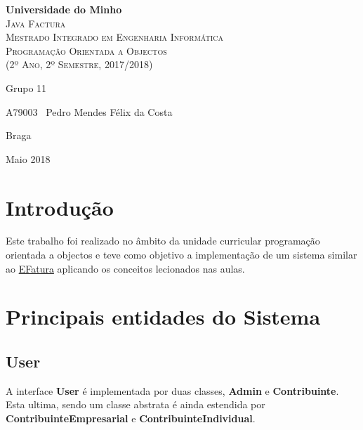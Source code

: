 \documentclass[10pt,a4paper]{article}
\begin{document}
\begin{titlepage}
    \center
    {\huge {\bf Universidade do Minho}}\\[0.4cm]
    \vspace{3.0cm}
    \textsc{\huge{Java Factura}}\\[0.5cm]
    \vspace{3.0cm}
    \textsc{\huge{Mestrado Integrado em Engenharia Informática}}\\[0.5cm]
    \vspace{2.0cm}
    \textsc{Programação Orientada a Objectos}\\[0.5cm]
    \textsc{(2º Ano, 2º Semestre, 2017/2018)}\\[0.5cm]
    \vspace{1.5cm}
    \begin{flushleft}
        Grupo 11
        \vspace{1cm}

        A79003 \,\,\,Pedro Mendes Félix da Costa
    \end{flushleft}
        \vspace{1cm}
    \begin{flushright}
        Braga

        Maio 2018
    \end{flushright}

\end{titlepage}

\tableofcontents
\clearpage

\section{Introdução}
    Este trabalho foi realizado no âmbito da unidade curricular programação
    orientada a objectos e teve como objetivo a implementação de um sistema
    similar ao \href{www.efactura.pt}{EFatura} aplicando os conceitos
    lecionados nas aulas.

\section{Principais entidades do Sistema}
    \subsection{User}
    A interface \textbf{User} é implementada por duas classes, \textbf{Admin} e
    \textbf{Contribuinte}. Esta ultima, sendo um classe abstrata é ainda
    estendida por \textbf{ContribuinteEmpresarial} e
    \textbf{ContribuinteIndividual}.
\end{document}
